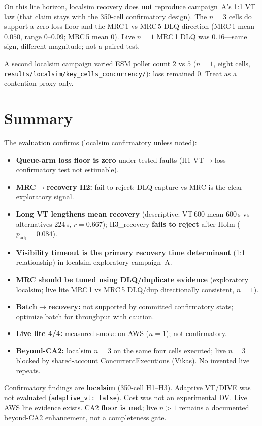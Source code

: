 On this lite horizon, localsim recovery does \textbf{not} reproduce campaign~A's 1:1 VT law (that claim stays with the 350-cell confirmatory design). The $n{=}3$ cells do support a zero loss floor and the MRC\,1 vs MRC\,5 DLQ direction (MRC\,1 mean $0.050$, range $0$--$0.09$; MRC\,5 mean $0$). Live $n{=}1$ MRC\,1 DLQ was $0.16$---same sign, different magnitude; not a paired test.

A second localsim campaign varied ESM poller count $2$ vs $5$ ($n{=}1$, eight cells, \texttt{results/localsim/key\_cells\_concurrency/}): loss remained $0$. Treat as a contention proxy only.

\section{Summary}

The evaluation confirms (localsim confirmatory unless noted):
\begin{itemize}
    \item \textbf{Queue-arm loss floor is zero} under tested faults (H1 VT$\rightarrow$loss confirmatory test not estimable).
    \item \textbf{MRC$\rightarrow$recovery H2:} fail to reject; DLQ capture vs MRC is the clear exploratory signal.
    \item \textbf{Long VT lengthens mean recovery} (descriptive: VT\,600 mean $600$\,s vs alternatives $224$\,s, $r=0.667$); H3\_recovery \textbf{fails to reject} after Holm ($p_{\mathrm{adj}}=0.084$).
    \item \textbf{Visibility timeout is the primary recovery time determinant} (1:1 relationship) in localsim exploratory campaign~A.
    \item \textbf{MRC should be tuned using DLQ/duplicate evidence} (exploratory localsim; live lite MRC\,1 vs MRC\,5 DLQ/dup directionally consistent, $n=1$).
    \item \textbf{Batch$\rightarrow$recovery:} not supported by committed confirmatory stats; optimize batch for throughput with caution.
    \item \textbf{Live lite 4/4:} measured smoke on AWS ($n{=}1$); not confirmatory.
    \item \textbf{Beyond-CA2:} localsim $n{=}3$ on the same four cells executed; live $n{=}3$ blocked by shared-account ConcurrentExecutions (Vikas). No invented live repeats.
\end{itemize}

Confirmatory findings are \textbf{localsim} (350-cell H1--H3). Adaptive VT/DIVE was not evaluated (\texttt{adaptive\_vt: false}). Cost was not an experimental DV. Live AWS lite evidence exists. CA2 \textbf{floor is met}; live $n{>}1$ remains a documented beyond-CA2 enhancement, not a completeness gate.
